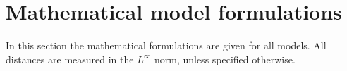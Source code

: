 \documentclass{article}
\newcommand{\set}[1]{\mathcal{#1}}
\newcommand{\norm}[1]{\big\| #1\big\| }
\begin{document}
\section{Mathematical model formulations}
In this section the mathematical formulations are given for all models. All distances are measured in the $L^{\infty}$ norm, unless specified otherwise.  
\end{document}
